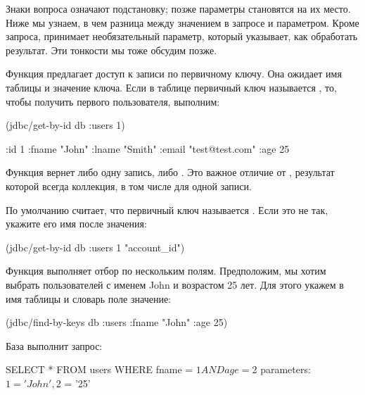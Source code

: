 Знаки вопроса означают подстановку; позже параметры становятся на их место. Ниже мы узнаем, в чем разница между значением в запросе и параметром. Кроме запроса,  принимает необязательный параметр, который указывает, как обработать результат. Эти тонкости мы тоже обсудим позже.

Функция  предлагает доступ к записи по первичному ключу. Она ожидает имя таблицы и значение ключа. Если в таблице  первичный ключ называется , то, чтобы получить первого пользователя, выполним:

\begin{english}
  \begin{clojure}
(jdbc/get-by-id db :users 1)

{:id 1
 :fname "John"
 :lname "Smith"
 :email "test@test.com"
 :age 25}
  \end{clojure}
\end{english}

Функция вернет либо одну запись, либо . Это важное отличие от , результат которой всегда коллекция, в том числе для одной записи.

По умолчанию  считает, что первичный ключ называется . Если это не так, укажите  его имя после значения:

\begin{english}
  \begin{clojure}
(jdbc/get-by-id db :users 1 "account_id")
  \end{clojure}
\end{english}

Функция  выполняет отбор по нескольким полям. Предположим, мы хотим выбрать пользователей с именем John и возрастом 25 лет. Для этого укажем в  имя таблицы и словарь поле \arr значение:

\begin{english}
  \begin{clojure}
(jdbc/find-by-keys db :users {:fname "John" :age 25})
  \end{clojure}
\end{english}

База выполнит запрос:

\begin{english}
  \begin{sql}
SELECT * FROM users WHERE fname = $1 AND age = $2
parameters: $1 = 'John', $2 = '25'
  \end{sql}
\end{english}

